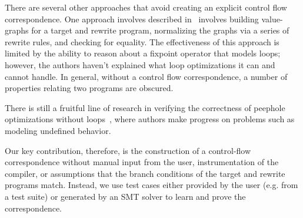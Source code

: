 
There are several other approaches that avoid creating an explicit
control flow correspondence. One approach involves described
in~\cite{Tristan2011} involves building value-graphs for a target and
rewrite program, normalizing the graphs via a series of rewrite rules,
and checking for equality. The effectiveness of this approach is
limited by the ability to reason about a fixpoint operator that models
loops; however, the authors haven't explained what loop optimizations
it can and cannot handle. In general, without a control flow correspondence, a
number of properties relating two programs are obscured.

There is still a fruitful line of research in verifying the
correctness of peephole optimizations without loops~\cite{Lopes2015},
where authors make progress on problems such as modeling undefined
behavior.

Our key contribution, therefore, is the construction of a control-flow
correspondence without manual input from the user, instrumentation of
the compiler, or assumptions that the branch conditions of the target
and rewrite programs match. Instead, we use test cases either provided
by the user (e.g. from a test suite) or generated by an SMT solver to
learn and prove the correspondence.

